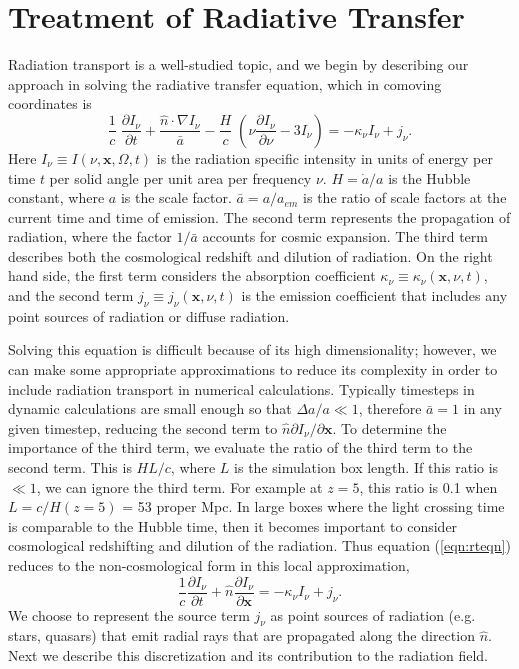 \documentclass[useAMS,usenatbib]{mn2e}
\begin{document}
\section{Treatment of Radiative Transfer}

Radiation transport is a well-studied topic, and we begin by
describing our approach in solving the radiative transfer equation,
which in comoving coordinates \citep{Gnedin97} is
%
\begin{equation}
  \label{eqn:rteqn}
  \frac{1}{c} \; \frac{\partial I_\nu}{\partial t} + 
  \frac{\hat{n} \cdot \nabla I_\nu}{\bar{a}} -
  \frac{H}{c} \; \left( \nu \frac{\partial I_\nu}{\partial \nu} -
  3 I_\nu \right) = -\kappa_\nu I_\nu + j_\nu .
\end{equation}
%
Here $I_\nu \equiv I(\nu, \mathbf{x}, \Omega, t)$ is the radiation
specific intensity in units of energy per time $t$ per solid angle per
unit area per frequency $\nu$.  $H = \dot{a}/a$ is the Hubble
constant, where $a$ is the scale factor.  $\bar{a} = a/a_{em}$ is the
ratio of scale factors at the current time and time of emission.  The
second term represents the propagation of radiation, where the factor
$1/\bar{a}$ accounts for cosmic expansion.  The third term describes
both the cosmological redshift and dilution of radiation.  On the
right hand side, the first term considers the absorption coefficient
$\kappa_\nu \equiv \kappa_\nu(\mathbf{x},\nu,t)$, and the second term
$j_\nu \equiv j_\nu(\mathbf{x},\nu,t)$ is the emission coefficient
that includes any point sources of radiation or diffuse radiation.

Solving this equation is difficult because of its high dimensionality;
however, we can make some appropriate approximations to reduce its
complexity in order to include radiation transport in numerical
calculations.  Typically timesteps in dynamic calculations are small
enough so that $\Delta a/a \ll 1$, therefore $\bar{a} = 1$ in any
given timestep, reducing the second term to $\hat{n} \partial
I_\nu/\partial \mathbf{x}$.  To determine the importance of the third
term, we evaluate the ratio of the third term to the second term.
This is $HL/c$, where $L$ is the simulation box length.  If this ratio
is $\ll 1$, we can ignore the third term.  For example at $z=5$, this
ratio is 0.1 when $L = c/H(z=5)$ = 53 proper Mpc.  In large boxes
where the light crossing time is comparable to the Hubble time, then
it becomes important to consider cosmological redshifting and dilution
of the radiation.  Thus equation (\ref{eqn:rteqn}) reduces to the
non-cosmological form in this local approximation,
%
\begin{equation}
  \frac{1}{c} \frac{\partial I_\nu}{\partial t} + 
  \hat{n} \frac{\partial I_\nu}{\partial \mathbf{x}} =
  -\kappa_\nu I_\nu + j_\nu .
\end{equation}
%
We choose to represent the source term $j_\nu$ as point sources of
radiation (e.g. stars, quasars) that emit radial rays that are
propagated along the direction $\hat{n}$.  Next we describe this
discretization and its contribution to the radiation field.
\end{document}
